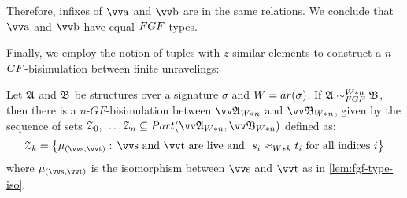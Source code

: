 Therefore, infixes of $\elemtuptuplea$ and $\elemtuptupleb$ are in the same relations.
We conclude that $\elemtuptuplea$ and $\elemtuptupleb$ have equal $\FGF$-types.

Finally, we employ the notion of tuples with $z$-similar elements to construct a $n$-$\GF$-bisimulation between finite unravelings:
\begin{lemma}
  Let ${\mathfrak{A}}$ and ${\mathfrak{B}}$ be structures over a signature $\sigma$ and $W = \arity(\sigma)$.
  If $\str{A} \bisimto_{\FGF}^{W * n} \str{B}$, then there is a $n$-$GF$-bisimulation between $\unravel{A}_{W * n}$ and $\unravel{B}_{W * n}$, given by the sequence of sets $\bisimZ_{0}, \ldots, \bisimZ_{n} \subseteq \PartIso{\unravel{A}_{W * n}}{\unravel{B}_{W * n}}$ defined as:
  \begin{equation*}
    \bisimZ_{k} = \left\{
      \mu_{(\elemtuptuples, \elemtuptuplet)}:\,
      \elemtuptuples\ \text{and}\ \elemtuptuplet\ \text{are live and}\ \
      s_{i} \approx_{W * k} t_{i}\ \text{for all indices $i$}
    \right\}
  \end{equation*}
  where $\mu_{(\elemtuptuples, \elemtuptuplet)}$ is the isomorphism between $\elemtuptuples$ and $\elemtuptuplet$ as in \cref{lem:fgf-type-iso}.
\end{lemma}
